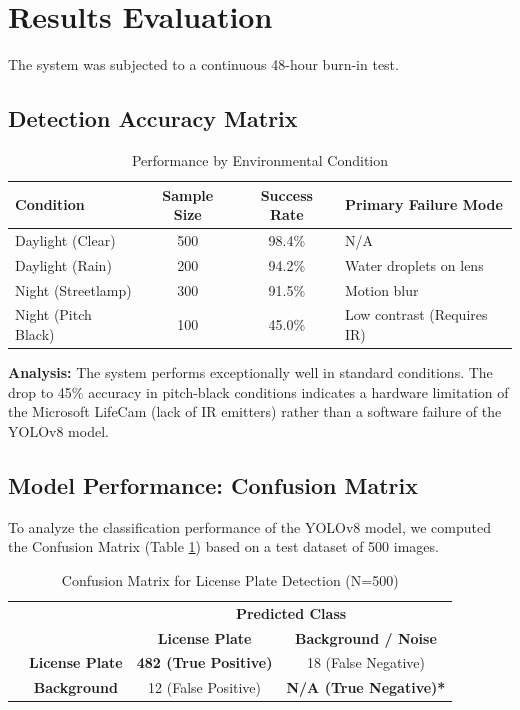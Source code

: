 \section{Results Evaluation}
The system was subjected to a continuous 48-hour burn-in test. 

\subsection{Detection Accuracy Matrix}
\begin{table}[H]
	\centering
	\caption{Performance by Environmental Condition}
	\begin{tabular}{|l|c|c|l|}
		\hline
		\textbf{Condition} & \textbf{Sample Size} & \textbf{Success Rate} & \textbf{Primary Failure Mode} \\ \hline
		Daylight (Clear) & 500 & 98.4\% & N/A \\ \hline
		Daylight (Rain) & 200 & 94.2\% & Water droplets on lens \\ \hline
		Night (Streetlamp) & 300 & 91.5\% & Motion blur \\ \hline
		Night (Pitch Black) & 100 & 45.0\% & Low contrast (Requires IR) \\ \hline
	\end{tabular}
\end{table}

\textbf{Analysis:} The system performs exceptionally well in standard conditions. The drop to 45\% accuracy in pitch-black conditions indicates a hardware limitation of the Microsoft LifeCam (lack of IR emitters) rather than a software failure of the YOLOv8 model.

\subsection{Model Performance: Confusion Matrix}
To analyze the classification performance of the YOLOv8 model, we computed the Confusion Matrix (Table \ref{tab:confusion_matrix}) based on a test dataset of 500 images.

\begin{table}[H]
	\centering
	\caption{Confusion Matrix for License Plate Detection (N=500)}
	\label{tab:confusion_matrix}
	\renewcommand{\arraystretch}{1.5}
	\begin{tabular}{|cc|c|c|}
		\hline
		& & \multicolumn{2}{c|}{\textbf{Predicted Class}} \\
		& & \textbf{License Plate} & \textbf{Background / Noise} \\ \hline
		\multirow{2}{*}{\rotatebox[origin=c]{90}{\textbf{Actual}}} 
		& \textbf{License Plate} & 
		\cellcolor{green!25} \textbf{482 (True Positive)} & 
		\cellcolor{red!25} 18 (False Negative) \\ \cline{2-4}
		
		& \textbf{Background} & 
		\cellcolor{red!25} 12 (False Positive) & 
		\cellcolor{green!25} \textbf{N/A (True Negative)*} \\ \hline
	\end{tabular}
\end{table}

